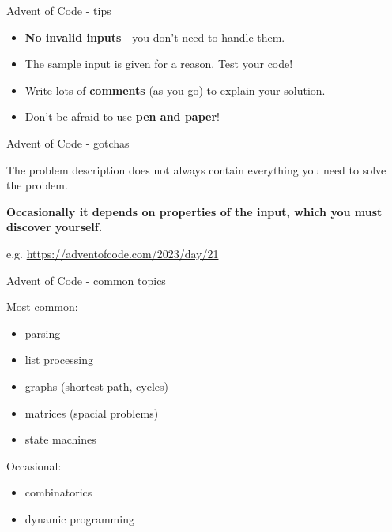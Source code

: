 \documentclass[ignorenonframetext,aspectratio=169,12pt]{beamer}
\begin{document}
\begin{frame}{Advent of Code - tips}

    \begin{itemize}
        \item {\bf No invalid inputs}---you don't need to handle them.
        \item The sample input is given for a reason.  Test your code!
        \item Write lots of {\bf comments} (as you go) to explain
            your solution.
        \item Don't be afraid to use {\bf pen and paper}!
    \end{itemize}


\end{frame}


\begin{frame}{Advent of Code - gotchas}

The problem description does not always contain everything you need
to solve the problem.

{\bf Occasionally it depends on properties of the input, which you must
    discover yourself.}

e.g. \url{https://adventofcode.com/2023/day/21}

\end{frame}


\begin{frame}{Advent of Code - common topics}

    Most common:

    \begin{itemize}
        \item parsing
        \item list processing
        \item graphs (shortest path, cycles)
        \item matrices (spacial problems)
        \item state machines
    \end{itemize}

    Occasional:

    \begin{itemize}
        \item combinatorics
        \item dynamic programming
    \end{itemize}

\end{frame}
\end{document}
